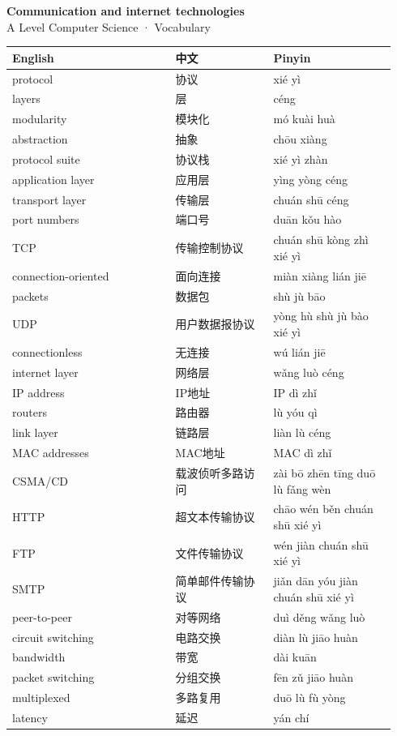 \documentclass[11pt]{article}
\begin{document}
\begin{center}
  {\LARGE\bfseries Communication and internet technologies}\\[0.35em]
  {\large A Level Computer Science · Vocabulary}
\end{center}
\vspace{0.6em}

\begin{longtable}{@{}p{0.40\linewidth}p{0.24\linewidth}p{0.30\linewidth}@{}}
\toprule
\textbf{English} & \textbf{中文} & \textbf{Pinyin} \\
\midrule
\endhead
\bottomrule
\endlastfoot
protocol & 协议 & xié yì \\
layers & 层 & céng \\
modularity & 模块化 & mó kuài huà \\
abstraction & 抽象 & chōu xiàng \\
protocol suite & 协议栈 & xié yì zhàn \\
application layer & 应用层 & yìng yòng céng \\
transport layer & 传输层 & chuán shū céng \\
port numbers & 端口号 & duān kǒu hào \\
TCP & 传输控制协议 & chuán shū kòng zhì xié yì \\
connection-oriented & 面向连接 & miàn xiàng lián jiē \\
packets & 数据包 & shù jù bāo \\
UDP & 用户数据报协议 & yòng hù shù jù bào xié yì \\
connectionless & 无连接 & wú lián jiē \\
internet layer & 网络层 & wǎng luò céng \\
IP address & IP地址 & IP dì zhǐ \\
routers & 路由器 & lù yóu qì \\
link layer & 链路层 & liàn lù céng \\
MAC addresses & MAC地址 & MAC dì zhǐ \\
CSMA/CD & 载波侦听多路访问 & zài bō zhēn tīng duō lù fǎng wèn \\
HTTP & 超文本传输协议 & chāo wén běn chuán shū xié yì \\
FTP & 文件传输协议 & wén jiàn chuán shū xié yì \\
SMTP & 简单邮件传输协议 & jiǎn dān yóu jiàn chuán shū xié yì \\
peer-to-peer & 对等网络 & duì děng wǎng luò \\
circuit switching & 电路交换 & diàn lù jiāo huàn \\
bandwidth & 带宽 & dài kuān \\
packet switching & 分组交换 & fēn zǔ jiāo huàn \\
multiplexed & 多路复用 & duō lù fù yòng \\
latency & 延迟 & yán chí \\
\end{longtable}
\end{document}
